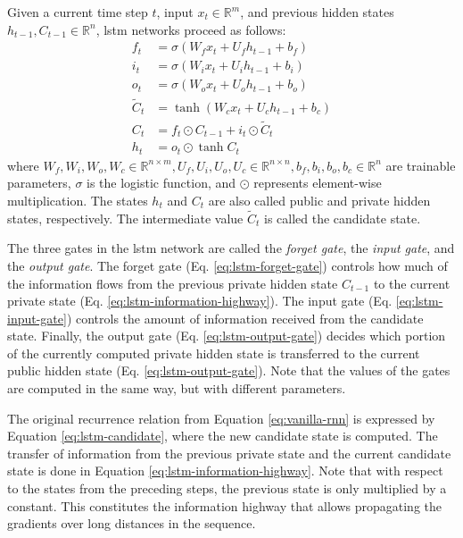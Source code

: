 Given a current time step $t$, input $x_t \in \mathbb{R}^m$, and previous
hidden states $h_{t-1}, C_{t-1} \in \mathbb{R}^n$, \ac{lstm} networks proceed
as follows:
%
\begin{align}
  f_t &= \sigma\left(W_f x_t + U_f h_{t-1} + b_f\right) \label{eq:lstm-forget-gate} \\
  i_t &= \sigma\left(W_i x_t + U_i h_{t-1} + b_i\right) \label{eq:lstm-input-gate} \\
  o_t &= \sigma\left(W_o x_t + U_o h_{t-1} + b_o\right) \label{eq:lstm-output-gate} \\
  \tilde{C}_t &= \tanh \left( W_c x_t + U_c h_{t-1} + b_c \right) \label{eq:lstm-candidate} \\
  C_t &= f_t \odot C_{t-1} + i_t \odot \tilde{C}_t \label{eq:lstm-information-highway} \\
  h_t &= o_t \odot \tanh C_t \label{eq:lstm-hidden-state}
\end{align}
%
where $W_f, W_i, W_o, W_c \in \mathbb{R}^{n \times m}, U_f, U_i, U_o, U_c \in
\mathbb{R}^{n \times n}, b_f, b_i, b_o, b_c \in \mathbb{R}^n$ are trainable
parameters, $\sigma$ is the logistic function, and $\odot$ represents
element-wise multiplication. The states $h_t$ and $C_t$ are also called public
and private hidden states, respectively. The intermediate value $\tilde{C}_t$ is
called the candidate state.

The three gates in the \ac{lstm} network are called the \emph{forget gate}, the
\emph{input gate}, and the \emph{output gate}. The forget gate (Eq.
\ref{eq:lstm-forget-gate}) controls how much of the information flows from the
previous private hidden state $C_{t-1}$ to the current private state (Eq.
\ref{eq:lstm-information-highway}). The input gate (Eq.
\ref{eq:lstm-input-gate}) controls the amount of information received from the
candidate state. Finally, the output gate (Eq. \ref{eq:lstm-output-gate})
decides which portion of the currently computed private hidden state is
transferred to the current public hidden state
(Eq. \ref{eq:lstm-output-gate}). Note that the values of the gates are computed
in the same way, but with different parameters.

The original recurrence relation from Equation \ref{eq:vanilla-rnn} is expressed
by Equation \ref{eq:lstm-candidate}, where the new candidate state is
computed. The transfer of information from the previous private state and the
current candidate state is done in Equation
\ref{eq:lstm-information-highway}. Note that with respect to the states from the
preceding steps, the previous state is only multiplied by a constant. This
constitutes the information highway that allows propagating the gradients over
long distances in the sequence.

